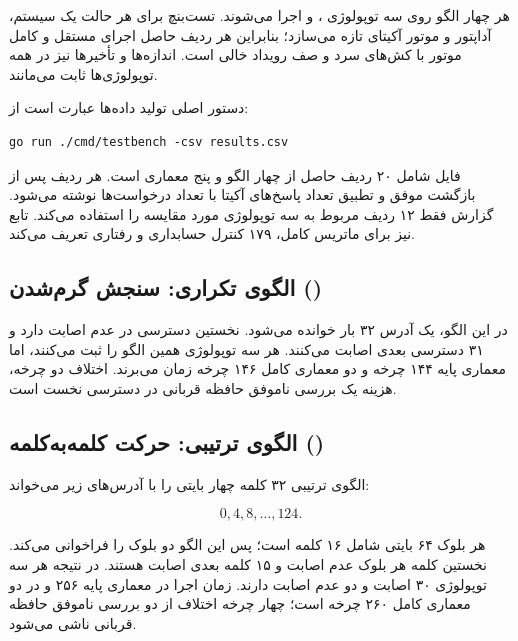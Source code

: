 \documentclass[oneside,a4paper,12pt]{article}
\newcommand{\مهم}[1]{\textbf{#1}}
\newcommand{\Arch}[1]{\lr{\texttt{#1}}}
\newcommand{\درصد}[1]{\lr{#1\%}}
\begin{document}
هر چهار الگو روی سه توپولوژی \Arch{l1-l2}، \Arch{full-fifo} و \Arch{full-lru} اجرا می‌شوند. تست‌بنچ برای هر حالت یک سیستم، آداپتور و موتور آکیتای تازه می‌سازد؛ بنابراین هر ردیف  حاصل اجرای مستقل و کامل موتور با کش‌های سرد و صف رویداد خالی است. اندازه‌ها و تأخیرها نیز در همه توپولوژی‌ها ثابت می‌مانند.

دستور اصلی تولید داده‌ها عبارت است از:

\begin{latin}
\begin{lstlisting}[language={},numbers=none]
go run ./cmd/testbench -csv results.csv
\end{lstlisting}
\end{latin}

فایل \Arch{results.csv} شامل ۲۰ ردیف حاصل از چهار الگو و پنج معماری است. هر ردیف پس از بازگشت موفق  و تطبیق تعداد پاسخ‌های آکیتا با تعداد درخواست‌ها نوشته می‌شود. گزارش فقط ۱۲ ردیف مربوط به سه توپولوژی مورد مقایسه را استفاده می‌کند. تابع  نیز برای ماتریس کامل، ۱۷۹ کنترل حسابداری و رفتاری تعریف می‌کند.

\subsection{الگوی تکراری: سنجش گرم‌شدن  ()}

در این الگو، یک آدرس ۳۲ بار خوانده می‌شود. نخستین دسترسی در  عدم اصابت دارد و ۳۱ دسترسی بعدی اصابت می‌کنند. هر سه توپولوژی همین الگو را ثبت می‌کنند، اما معماری پایه ۱۴۴ چرخه و دو معماری کامل ۱۴۶ چرخه زمان می‌برند. اختلاف دو چرخه، هزینه یک بررسی ناموفق حافظه قربانی در دسترسی نخست است.

\subsection{الگوی ترتیبی: حرکت کلمه‌به‌کلمه ()}

الگوی ترتیبی ۳۲ کلمه چهار بایتی را با آدرس‌های زیر می‌خواند:

\begin{equation}
0,4,8,\ldots,124.
\end{equation}

هر بلوک ۶۴ بایتی شامل ۱۶ کلمه است؛ پس این الگو دو بلوک را فراخوانی می‌کند. نخستین کلمه هر بلوک عدم اصابت و ۱۵ کلمه بعدی اصابت  هستند. در نتیجه هر سه توپولوژی ۳۰ اصابت و دو عدم اصابت دارند. زمان اجرا در معماری پایه ۲۵۶ و در دو معماری کامل ۲۶۰ چرخه است؛ چهار چرخه اختلاف از دو بررسی ناموفق حافظه قربانی ناشی می‌شود.
\end{document}
